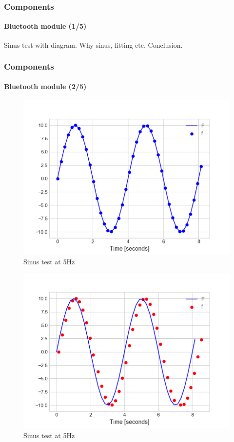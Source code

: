 \documentclass[10pt]{beamer}
\begin{document}
\begin{frame}
\frametitle{Components}
\framesubtitle{Bluetooth module (1/5)}
Sinus test with diagram. Why sinus, fitting etc. Conclusion.
\end{frame}


\begin{frame}
\frametitle{Components}
\framesubtitle{Bluetooth module (2/5)}
\begin{multicols}{2}
\begin{figure}
\centering
\includegraphics[scale=0.4]{figures/sending-5hz.png}
\caption{Sinus test at 5Hz}
\end{figure}
\columnbreak
\begin{figure}
\centering
\includegraphics[scale=0.4]{figures/reception-5hz.png}
\caption{Sinus test at 5Hz}
\end{figure}
\end{multicols}
\end{frame}
\end{document}
